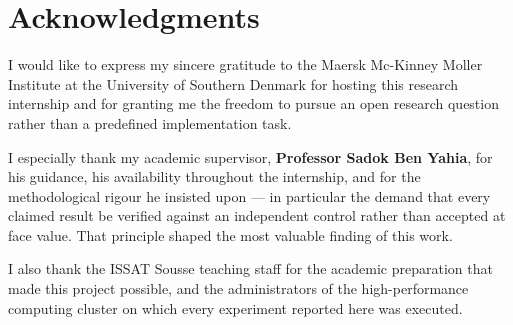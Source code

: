 \chapter*{Acknowledgments}

I would like to express my sincere gratitude to the Maersk Mc-Kinney
Moller Institute at the University of Southern Denmark for hosting this
research internship and for granting me the freedom to pursue an open
research question rather than a predefined implementation task.

I especially thank my academic supervisor, \textbf{Professor Sadok Ben
Yahia}, for his guidance, his availability throughout the internship, and
for the methodological rigour he insisted upon --- in particular the
demand that every claimed result be verified against an independent
control rather than accepted at face value. That principle shaped the
most valuable finding of this work.

I also thank the ISSAT Sousse teaching staff for the academic preparation
that made this project possible, and the administrators of the
high-performance computing cluster on which every experiment reported
here was executed.

\clearpage
